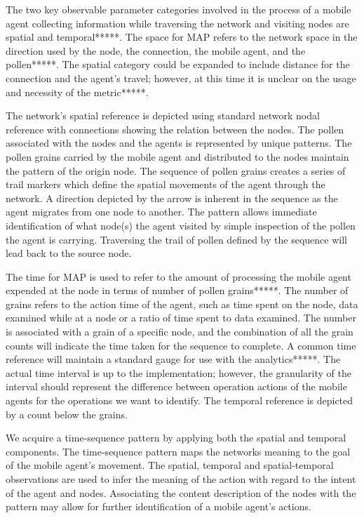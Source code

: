 \documentclass{acm_proc_article-sp}
\begin{document}
The two key observable parameter categories involved in the process of a mobile agent collecting information while traversing the network and visiting nodes are spatial and temporal*****.  The space for MAP refers to the network space in the direction used by the node, the connection, the mobile agent, and the pollen*****.  The spatial category could be expanded to include distance for the connection and the agent's travel; however, at this time it is unclear on the usage and necessity of the metric*****.

The network's spatial reference is depicted using standard network nodal reference with connections showing the relation between the nodes.  The pollen associated with the nodes and the agents is represented by unique patterns.  The pollen grains carried by the mobile agent and distributed to the nodes maintain the pattern of the origin node.  The sequence of pollen grains creates a series of trail markers which define the spatial movements of the agent through the network.  A direction depicted by the arrow is inherent in the sequence as the agent migrates from one node to another.  The pattern allows immediate identification of what node(s) the agent visited by simple inspection of the pollen the agent is carrying.  Traversing the trail of pollen defined by the sequence will lead back to the source node.

The time for MAP is used to refer to the amount of processing the mobile agent expended at the node in terms of number of pollen grains*****.  The number of grains refers to the action time of the agent, such as time spent on the node, data examined while at a node or a ratio of time spent to data examined.  The number is associated with a grain of a specific node, and the combination of all the grain counts will indicate the time taken for the sequence to complete.  A common time reference will maintain a standard gauge for use with the analytics*****.  The actual time interval is up to the implementation; however, the granularity of the interval should represent the difference between operation actions of the mobile agents for the operations we want to identify.  The temporal reference is depicted by a count below the grains.

We acquire a time-sequence pattern by applying both the spatial and temporal components.  The time-sequence pattern maps the networks meaning to the goal of the mobile agent's movement.  The spatial, temporal and spatial-temporal observations are used to infer the meaning of the action with regard to the intent of the agent and nodes.  Associating the content description of the nodes with the pattern may allow for further identification of a mobile agent's actions.
\end{document}
